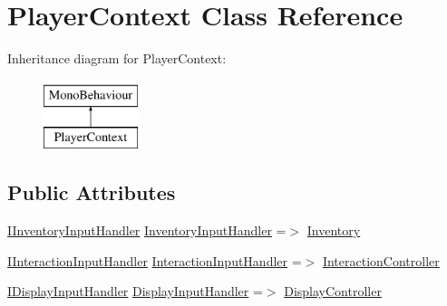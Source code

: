 \hypertarget{class_player_context}{}\section{Player\+Context Class Reference}
\label{class_player_context}
Inheritance diagram for Player\+Context\+:\begin{figure}[H]
\begin{center}
\leavevmode
\includegraphics[height=2.000000cm]{class_player_context}
\end{center}
\end{figure}
\subsection*{Public Attributes}
\begin{DoxyCompactItemize}
\item 
\mbox{\hyperlink{interface_i_inventory_input_handler}{I\+Inventory\+Input\+Handler}} \mbox{\hyperlink{class_player_context_ae39b126c6b5353de0f01bc0e90a2df16}{Inventory\+Input\+Handler}} =$>$ \mbox{\hyperlink{class_inventory}{Inventory}}
\item 
\mbox{\hyperlink{interface_i_interaction_input_handler}{I\+Interaction\+Input\+Handler}} \mbox{\hyperlink{class_player_context_a3b6b363dca05592b291c6b69ccd08121}{Interaction\+Input\+Handler}} =$>$ \mbox{\hyperlink{class_interaction_controller}{Interaction\+Controller}}
\item 
\mbox{\hyperlink{interface_i_display_input_handler}{I\+Display\+Input\+Handler}} \mbox{\hyperlink{class_player_context_afe76851a64e1dead1e592a564e1feea5}{Display\+Input\+Handler}} =$>$ \mbox{\hyperlink{class_display_controller}{Display\+Controller}}
\end{DoxyCompactItemize}
